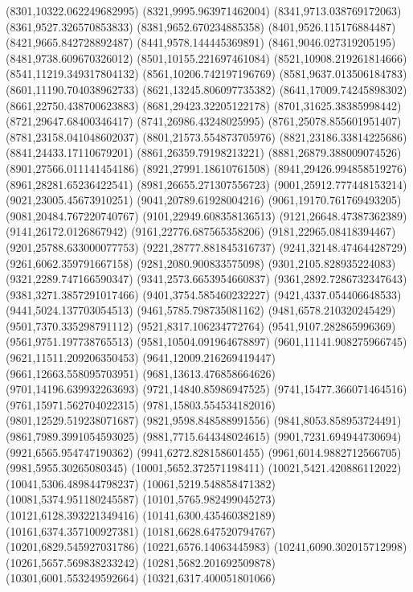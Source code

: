{(8301,10322.062249682995)
(8321,9995.963971462004)
(8341,9713.038769172063)
(8361,9527.326570853833)
(8381,9652.670234885358)
(8401,9526.115176884487)
(8421,9665.842728892487)
(8441,9578.144445369891)
(8461,9046.027319205195)
(8481,9738.609670326012)
(8501,10155.221697461084)
(8521,10908.219261814666)
(8541,11219.349317804132)
(8561,10206.742197196769)
(8581,9637.013506184783)
(8601,11190.704038962733)
(8621,13245.806097735382)
(8641,17009.74245898302)
(8661,22750.438700623883)
(8681,29423.32205122178)
(8701,31625.38385998442)
(8721,29647.68400346417)
(8741,26986.43248025995)
(8761,25078.855601951407)
(8781,23158.041048602037)
(8801,21573.554873705976)
(8821,23186.33814225686)
(8841,24433.17110679201)
(8861,26359.79198213221)
(8881,26879.388009074526)
(8901,27566.011141454186)
(8921,27991.18610761508)
(8941,29426.994858519276)
(8961,28281.65236422541)
(8981,26655.271307556723)
(9001,25912.777448153214)
(9021,23005.45673910251)
(9041,20789.61928004216)
(9061,19170.761769493205)
(9081,20484.767220740767)
(9101,22949.608358136513)
(9121,26648.47387362389)
(9141,26172.0126867942)
(9161,22776.687565358206)
(9181,22965.08418394467)
(9201,25788.633000077753)
(9221,28777.881845316737)
(9241,32148.47464428729)
(9261,6062.359791667158)
(9281,2080.900833575098)
(9301,2105.828935224083)
(9321,2289.747166590347)
(9341,2573.6653954660837)
(9361,2892.7286732347643)
(9381,3271.3857291017466)
(9401,3754.585460232227)
(9421,4337.054406648533)
(9441,5024.137703054513)
(9461,5785.798735081162)
(9481,6578.210320245429)
(9501,7370.335298791112)
(9521,8317.106234772764)
(9541,9107.282865996369)
(9561,9751.197738765513)
(9581,10504.091964678897)
(9601,11141.908275966745)
(9621,11511.209206350453)
(9641,12009.216269419447)
(9661,12663.558095703951)
(9681,13613.476858664626)
(9701,14196.639932263693)
(9721,14840.85986947525)
(9741,15477.366071464516)
(9761,15971.562704022315)
(9781,15803.554534182016)
(9801,12529.519238071687)
(9821,9598.848588991556)
(9841,8053.858953724491)
(9861,7989.3991054593025)
(9881,7715.644348024615)
(9901,7231.694944730694)
(9921,6565.954747190362)
(9941,6272.828158601455)
(9961,6014.9882712566705)
(9981,5955.30265080345)
(10001,5652.372571198411)
(10021,5421.420886112022)
(10041,5306.489844798237)
(10061,5219.548858471382)
(10081,5374.951180245587)
(10101,5765.982499045273)
(10121,6128.393221349416)
(10141,6300.435460382189)
(10161,6374.357100927381)
(10181,6628.647520794767)
(10201,6829.545927031786)
(10221,6576.14063445983)
(10241,6090.302015712998)
(10261,5657.569838233242)
(10281,5682.201692509878)
(10301,6001.553249592664)
(10321,6317.400051801066)
}

